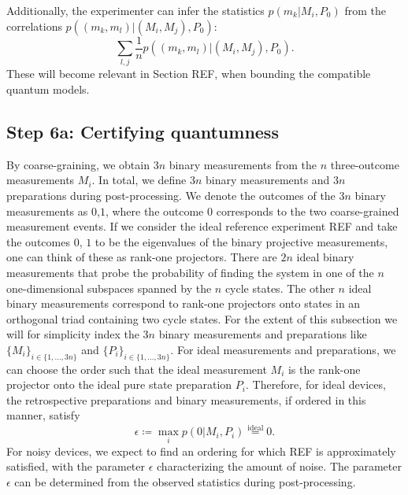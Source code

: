 Additionally, the experimenter can infer the statistics $p(m_k\vert M_i, P_0)$ from the correlations $p((m_k,m_l)\vert(M_i,M_j),P_0)$:
\begin{equation}
\sum_{l,j}\frac{1}{n}p((m_k,m_l)\vert (M_i,M_j),P_0).
\end{equation}
These will become relevant in Section REF, when bounding the compatible quantum models.
\subsection{Step 6a: Certifying quantumness}
By coarse-graining, we obtain $3n$ binary measurements from the $n$ three-outcome measurements $M_i$. In total, we define $3n$ binary measurements and $3n$ preparations during post-processing. We denote the outcomes of the $3n$ binary measurements as $0$,$1$, where the outcome $0$ corresponds to the two coarse-grained measurement events. If we consider the ideal reference experiment REF and take the outcomes $0$, $1$ to be the eigenvalues of the binary projective measurements, one can think of these as rank-one projectors. There are $2n$ ideal binary measurements that probe the probability of finding the system in one of the $n$ one-dimensional subspaces spanned by the $n$ cycle states. The other $n$ ideal binary measurements correspond to rank-one projectors onto states in an orthogonal triad containing two cycle states. For the extent of this subsection we will for simplicity index the $3n$ binary measurements and preparations like $\{M_i\}_{i\in\{1,\dots,3n\}}$ and $\{P_i\}_{i\in\{1,\dots,3n\}}$. For ideal measurements and preparations, we can choose the order such that the ideal measurement $M_i$ is the rank-one projector onto the ideal pure state preparation $P_i$. Therefore, for ideal devices, the retrospective preparations and binary measurements, if ordered in this manner, satisfy \begin{equation}
\epsilon \coloneqq \max_i p(0\vert M_i, P_i)\stackrel{\text{ideal}}{=}0.
\end{equation} 
For noisy devices, we expect to find an ordering for which REF is approximately satisfied, with the parameter $\epsilon$ characterizing the amount of noise. The parameter $\epsilon$ can be determined from the observed statistics during post-processing.

